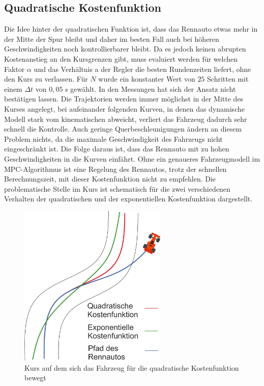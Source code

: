 \documentclass{like}
\begin{document}
\subsection{Quadratische Kostenfunktion}
Die Idee hinter der quadratischen Funktion ist, dass das Rennauto etwas mehr in der Mitte der Spur bleibt und daher im besten Fall auch bei höheren Geschwindigkeiten noch kontrollierbarer bleibt. Da es jedoch keinen abrupten Kostenanstieg an den Kursgrenzen gibt, muss evaluiert werden für welchen Faktor $\alpha$ und das Verhältnis a der Regler die besten Rundenzeiten liefert, ohne den Kurs zu verlassen. Für $N$ wurde ein konstanter Wert von $25$ Schritten mit einem $\Delta t$ von $0,05$ s gewählt. In den Messungen hat sich der Ansatz nicht bestätigen lassen. Die Trajektorien werden immer möglichst in der Mitte des Kurses angelegt, bei aufeinander folgenden Kurven, in denen das dynamische Modell stark vom kinematischen abweicht, verliert das Fahrzeug dadurch sehr schnell die Kontrolle. Auch geringe Querbeschleunigungen ändern an diesem Problem nichts, da die maximale Geschwindigkeit des Fahrzeugs nicht eingeschränkt ist. Die Folge daraus ist, dass das Rennauto mit zu hohen Geschwindigkeiten in die Kurven einfährt. Ohne ein genaueres Fahrzeugmodell im \ac{MPC}-Algorithmus ist eine Regelung des Rennautos, trotz der schnellen Berechnungszeit, mit dieser Kostenfunktion nicht zu empfehlen.
Die problematische Stelle im Kurs ist schematisch für die zwei verschiedenen Verhalten der quadratischen und der exponentiellen Kostenfunktion dargestellt. 

\begin{figure}[ht!]
	\centering
	\includegraphics[width=200pt]{Abbildungen/quadraticCostFunction.png}
	\caption{Kurs auf dem sich das Fahrzeug für die quadratische Kostenfunktion bewegt}
	\label{fig:quadraticCostFunct}
\end{figure}
\end{document}
